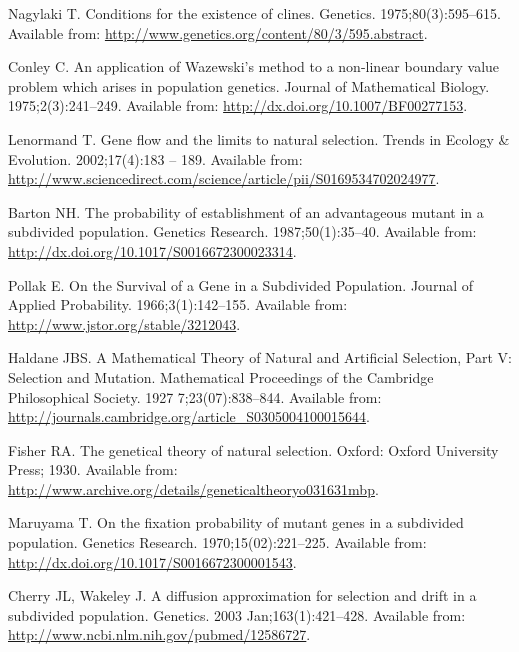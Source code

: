 \documentclass[10pt,letterpaper]{article}
\begin{document}
\begin{thebibliography}{10}
Nagylaki T.
\newblock Conditions for the existence of clines.
\newblock Genetics. 1975;80(3):595--615.
\newblock Available from:
  \url{http://www.genetics.org/content/80/3/595.abstract}.

Conley C.
\newblock An application of {Wazewski}'s method to a non-linear boundary value
  problem which arises in population genetics.
\newblock Journal of Mathematical Biology. 1975;2(3):241--249.
\newblock Available from: \url{http://dx.doi.org/10.1007/BF00277153}.

Lenormand T.
\newblock Gene flow and the limits to natural selection.
\newblock Trends in Ecology \& Evolution. 2002;17(4):183 -- 189.
\newblock Available from:
  \url{http://www.sciencedirect.com/science/article/pii/S0169534702024977}.

Barton NH.
\newblock The probability of establishment of an advantageous mutant in a
  subdivided population.
\newblock Genetics Research. 1987;50(1):35--40.
\newblock Available from: \url{http://dx.doi.org/10.1017/S0016672300023314}.

Pollak E.
\newblock On the Survival of a Gene in a Subdivided Population.
\newblock Journal of Applied Probability. 1966;3(1):142--155.
\newblock Available from: \url{http://www.jstor.org/stable/3212043}.

Haldane JBS.
\newblock A Mathematical Theory of Natural and Artificial Selection, Part {V}:
  Selection and Mutation.
\newblock Mathematical Proceedings of the Cambridge Philosophical Society. 1927
  7;23(07):838--844.
\newblock Available from:
  \url{http://journals.cambridge.org/article_S0305004100015644}.

Fisher RA.
\newblock The genetical theory of natural selection.
\newblock Oxford: Oxford University Press; 1930.
\newblock Available from:
  \url{http://www.archive.org/details/geneticaltheoryo031631mbp}.

Maruyama T.
\newblock On the fixation probability of mutant genes in a subdivided
  population.
\newblock Genetics Research. 1970;15(02):221--225.
\newblock Available from: \url{http://dx.doi.org/10.1017/S0016672300001543}.

Cherry JL, Wakeley J.
\newblock A diffusion approximation for selection and drift in a subdivided
  population.
\newblock Genetics. 2003 Jan;163(1):421--428.
\newblock Available from: \url{http://www.ncbi.nlm.nih.gov/pubmed/12586727}.


\end{thebibliography}
\end{document}

